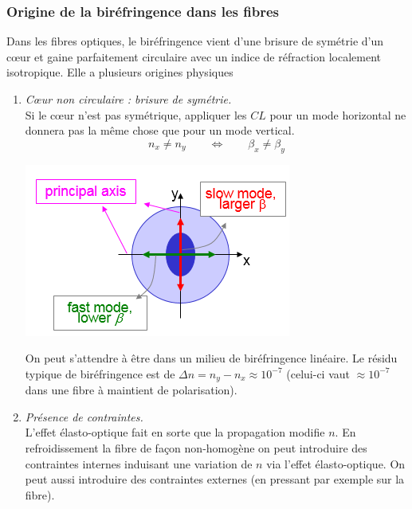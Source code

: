 \subsubsection{Origine de la biréfringence dans les fibres}
Dans les fibres optiques, le biréfringence vient d'une brisure de symétrie d'un cœur et 
gaine parfaitement circulaire avec un indice de réfraction localement isotropique. Elle a plusieurs
origines physiques
\begin{enumerate}
\item \textit{Cœur non circulaire : brisure de symétrie.}\\
Si le cœur n'est pas symétrique, appliquer les $CL$ pour un mode horizontal ne donnera pas la même
chose que pour un mode vertical. 
\begin{equation}
n_x\neq n_y\qquad\Leftrightarrow\qquad \beta_x\neq \beta_y
\end{equation}
	\begin{center}
		\includegraphics[scale=0.6]{ch1/image46}
	\end{center}	
On peut s'attendre à être dans un milieu de biréfringence linéaire. Le résidu typique de biréfringence
est de $\Delta n = {n_y} - {n_x} \approx {10^{ - 7}}$ (celui-ci vaut $\approx 10^{-7}$ dans une fibre
à maintient de polarisation).

\item \textit{Présence de contraintes.}\\
L'effet élasto-optique fait en sorte que la propagation modifie $n$. En refroidissement la fibre
de façon non-homogène on peut introduire des contraintes internes induisant une variation de $n$
via l'effet élasto-optique. On peut aussi introduire des contraintes externes (en pressant par exemple
sur la fibre). 


\end{enumerate}
